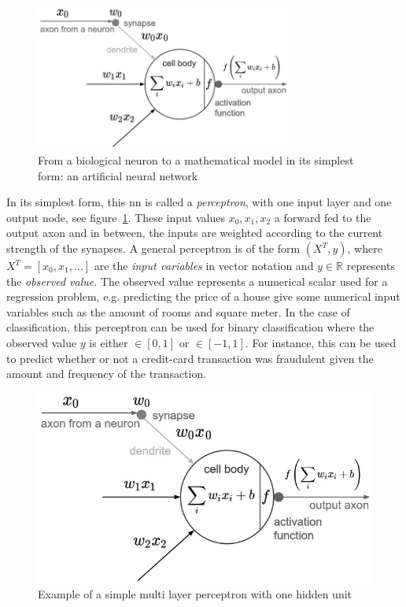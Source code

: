 \documentclass[draft,final]{vutinfth} %
\begin{document}
    \begin{figure}[h]
        \centering
        \includegraphics[width=0.75\textwidth]{figures/neuron_model.png}
        \caption[From a biological neuron to a mathematical model: an artificial neural network in its simplest form]{From a biological neuron to a mathematical model in its simplest form: an artificial neural network\protect\footnotemark}
        \label{fig:neuron_model}
    \end{figure}


    In its simplest form, this \gls{nn} is called a \textit{perceptron}, with one input layer and one output node, see figure~\ref{fig:neuron_model}.
    These input values $x_0,x_1,x_2$ a forward fed to the output axon and in between, the inputs are weighted according to the current strength of the synapses.
    A general perceptron is of the form $(X^T,y)$, where $X^T=[x_0,x_1,\ldots]$ are the \textit{input variables} in vector notation and $y \in \mathbb{R}$  represents the \textit{observed value}.
    The observed value represents a numerical scalar used for a regression problem, e.g. predicting the price of a house give some numerical input variables such as the amount of rooms and square meter.
    In the case of classification, this perceptron can be used for binary classification where the observed value $y$ is either $\in [0,1]$ or $\in [-1,1]$.
    For instance, this can be used to predict whether or not a credit-card transaction was fraudulent given the amount and frequency of the transaction.



    \begin{figure}[h]
        \centering
        \includegraphics[width=\textwidth]{figures/neuron_model.png}
        \caption{Example of a simple multi layer perceptron with one hidden unit}
        \label{fig:mlp}
    \end{figure}
\end{document}
